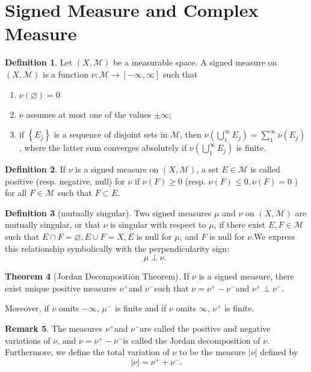 \documentclass[12pt,a4paper]{book}
\newenvironment{enu}{\begin{enumerate}[(1)]}{\end{enumerate}}
\theoremstyle{definition}
\newtheorem{defn}{Definition}[section]
\newtheorem{theo}[defn]{Theorem}
\newtheorem{rema}[defn]{Remark}
\begin{document}
\section{Signed Measure and Complex Measure}
\begin{defn}
    Let $(X, \mathcal{M})$ be a measurable space. A signed measure on $(X, \mathcal{M})$ is a function $\nu: \mathcal{M} \rightarrow[-\infty, \infty]$ such that
    \begin{enu}
        \item $\nu(\varnothing)=0$
        \item $\nu$ assumes at most one of the values $\pm \infty$;
        \item if $\left\{E_j\right\}$ is a sequence of disjoint sets in $\mathcal{M}$, then $\nu\left(\bigcup_1^{\infty} E_j\right)=\sum_1^{\infty} \nu\left(E_j\right)$, where the latter sum converges absolutely if $\nu\left(\bigcup_1^{\infty} E_j\right)$ is finite.
    \end{enu}
\end{defn}
\begin{defn}
    If $\nu$ is a signed measure on $(X, \mathcal{M})$, a set $E \in \mathcal{M}$ is called positive (resp. negative, null) for $\nu$ if $\nu(F) \geq 0$ (resp. $\nu(F) \leq 0, \nu(F)=0$ ) for all $F \in \mathcal{M}$ such that $F \subset E$.
\end{defn}
\begin{defn}[mutually singular]
    Two signed measures $\mu$ and $\nu$ on $(X, \mathcal{M})$ are mutually singular, or that $\nu$ is singular with respect to $\mu$, if there exist $E, F \in \mathcal{M}$ such that $E \cap F=\varnothing, E \cup F=X, E$ is null for $\mu$, and $F$ is null for $\nu$.We express this relationship symbolically with the perpendicularity sign:
    $$
        \mu \perp \nu \text {. }
    $$
\end{defn}
\begin{theo}[Jordan Decomposition Theorem]
    If $\nu$ is a signed measure, there exist unique positive measures $\nu^{+}$and $\nu^{-}$such that $\nu=\nu^{+}-\nu^{-}$and $\nu^{+} \perp \nu^{-}$.

    Moreover, if $\nu$ omits $-\infty$, $\mu^{-}$ is finite and if $\nu$ omits $\infty$, $\nu^{+}$ is finite.
\end{theo}
\begin{rema}
    The measures $\nu^{+}$and $\nu^{-}$are called the positive and negative variations of $\nu$, and $\nu=\nu^{+}-\nu^{-}$is called the Jordan decomposition of $\nu$. Furthermore, we define the total variation of $\nu$ to be the measure $|\nu|$ defined by
    $$
        |\nu|=\nu^{+}+\nu^{-} .
    $$
\end{rema}
\end{document}
